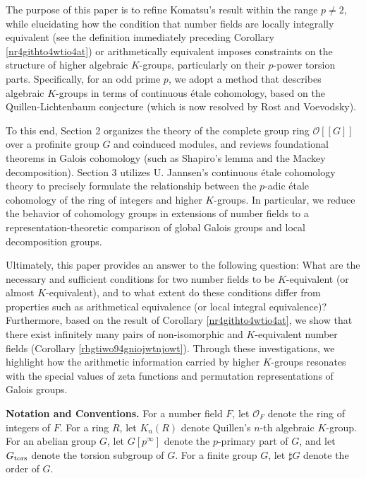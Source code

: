 \documentclass{article}
\numberwithin{equation}{section} %
\begin{document}
The purpose of this paper is to refine Komatsu's result within the range $p \neq 2$, while elucidating how the condition that number fields are locally integrally equivalent (see the definition immediately preceding Corollary \ref{nr4githto4wtio4at}) or arithmetically equivalent imposes constraints on the structure of higher algebraic $K$-groups, particularly on their $p$-power torsion parts. Specifically, for an odd prime $p$, we adopt a method that describes algebraic $K$-groups in terms of continuous étale cohomology, based on the Quillen-Lichtenbaum conjecture (which is now resolved by Rost and Voevodsky).

To this end, Section 2 organizes the theory of the complete group ring $\mathcal{O}[[G]]$ over a profinite group $G$ and coinduced modules, and reviews foundational theorems in Galois cohomology (such as Shapiro's lemma and the Mackey decomposition). Section 3 utilizes U. Jannsen's continuous étale cohomology theory to precisely formulate the relationship between the $p$-adic étale cohomology of the ring of integers and higher $K$-groups. In particular, we reduce the behavior of cohomology groups in extensions of number fields to a representation-theoretic comparison of global Galois groups and local decomposition groups.

Ultimately, this paper provides an answer to the following question: What are the necessary and sufficient conditions for two number fields to be $K$-equivalent (or almost $K$-equivalent), and to what extent do these conditions differ from properties such as arithmetical equivalence (or local integral equivalence)? Furthermore, based on the result of Corollary \ref{nr4githto4wtio4at}, we show that there exist infinitely many pairs of non-isomorphic and $K$-equivalent number fields (Corollary \ref{rhgtiwo94gniojwtnjowt}). Through these investigations, we highlight how the arithmetic information carried by higher $K$-groups resonates with the special values of zeta functions and permutation representations of Galois groups.

    \vspace{0.2cm}

    \textbf{Notation and Conventions.} For a number field $F$, let $\mathcal{O}_F$ denote the ring of integers of $F$. For a ring $R$, let $K_n(R)$ denote Quillen's $n$-th algebraic $K$-group. For an abelian group $G$, let $G[p^\infty]$ denote the $p$-primary part of $G$, and let $G_{\rm tors}$ denote the torsion subgroup of $G$. For a finite group $G$, let $\sharp G$ denote the order of $G$.
\end{document}
